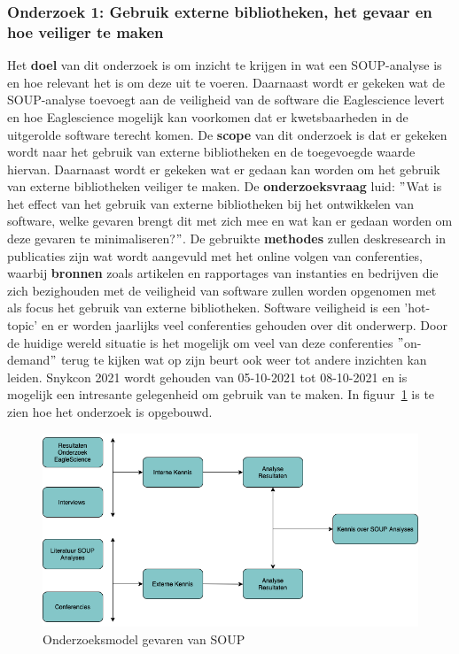\subsubsection{Onderzoek 1: Gebruik externe bibliotheken, het gevaar en hoe veiliger te maken}
Het \textbf{doel} van dit onderzoek is om inzicht te krijgen in wat een SOUP-analyse is en hoe relevant het is om deze uit te voeren. Daarnaast wordt er gekeken wat de SOUP-analyse toevoegt aan de veiligheid van de software die Eaglescience levert en hoe Eaglescience mogelijk kan voorkomen dat er kwetsbaarheden in de uitgerolde software terecht komen.
De \textbf{scope} van dit onderzoek is dat er gekeken wordt naar het gebruik van externe bibliotheken en de toegevoegde waarde hiervan. Daarnaast wordt er gekeken wat er gedaan kan worden om het gebruik van externe bibliotheken veiliger te maken.
De \textbf{onderzoeksvraag} luid: $"$Wat is het effect van het gebruik van externe bibliotheken bij het ontwikkelen van software, welke gevaren brengt dit met zich mee en wat kan er gedaan worden om deze gevaren te minimaliseren?$"$.
De gebruikte \textbf{methodes} zullen deskresearch in publicaties zijn wat wordt aangevuld met het online volgen van conferenties, waarbij \textbf{bronnen} zoals artikelen en rapportages van instanties en bedrijven die zich bezighouden met de veiligheid van software zullen worden opgenomen met als focus het gebruik van externe bibliotheken. Software veiligheid is een 'hot-topic' en er worden jaarlijks veel conferenties gehouden over dit onderwerp. Door de huidige wereld situatie is het mogelijk om veel van deze conferenties $"$on-demand$"$ terug te kijken wat op zijn beurt ook weer tot andere inzichten kan leiden. Snykcon 2021 wordt gehouden van 05-10-2021 tot 08-10-2021 en is mogelijk een intresante gelegenheid om gebruik van te maken. In figuur~\ref{fig:OnderzoeksModelNoodZaakSOUP} is te zien hoe het onderzoek is opgebouwd.
\begin{figure}[htbp]
    \myfloatalign
    \includegraphics[width=12cm]{gfx/OnderzoeksmodelSOUP}
    \caption{Onderzoeksmodel gevaren van SOUP}
    \label{fig:OnderzoeksModelNoodZaakSOUP}
\end{figure}


